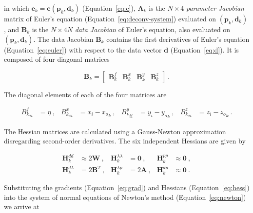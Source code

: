 \noindent
in which $\mathbf{e}_k = \mathbf{e}(\mathbf{p}_k,\mathbf{d}_k)$
(Equation~\ref{eq:e}), $\mathbf{A}_k$ is the $N \times 4$ \textit{parameter
Jacobian} matrix of Euler's equation (Equation~\ref{eq:deconv-system})
evaluated on $(\mathbf{p}_k,\mathbf{d}_k)$, and $\mathbf{B}_k$ is the $N \times
4N$ \textit{data Jacobian} of Euler's equation, also evaluated on
$(\mathbf{p}_k,\mathbf{d}_k)$.
The data Jacobian $\mathbf{B}_k$ contains the first derivatives of Euler's
equation (Equation~\ref{eq:euler})
with respect to the data vector $\mathbf{d}$ (Equation~\ref{eq:d}).
It is composed of four diagonal matrices

\begin{equation}
  \mathbf{B}_k =
  \begin{bmatrix}
    \mathbf{B}^f_k &
    \mathbf{B}^x_k &
    \mathbf{B}^y_k &
    \mathbf{B}^z_k
  \end{bmatrix}
  \ .
  \label{eq:B}
\end{equation}

\noindent
The diagonal elements of each of the four matrices are

\begin{equation}
  \begin{aligned}
    {B^f_k}_{ii} &= \eta \ , &
    {B^x_k}_{ii} &= x_i - {x_o}_k \ , &
    {B^y_k}_{ii} &= y_i - {y_o}_k \ , &
    {B^z_k}_{ii} &= z_i - {z_o}_k \ .
  \end{aligned}
\end{equation}

The Hessian matrices are calculated using a Gauss-Newton approximation
disregarding second-order derivatives. The six independent Hessians are given
by

\begin{equation}
  \begin{aligned}
    \mathbf{H}^{dd}_k &\approx 2\mathbf{W} \ , &
    \mathbf{H}^{\lambda\lambda}_k &= \mathbf{0} \ , &
    \mathbf{H}^{pp}_k &\approx \mathbf{0} \ ,
    \\
    \mathbf{H}^{d\lambda}_k &= 2\mathbf{B}^T \ , &
    \mathbf{H}^{\lambda p}_k &= 2\mathbf{A} \ , &
    \mathbf{H}^{dp}_k &\approx \mathbf{0} \ .
  \end{aligned}
  \label{eq:hess}
\end{equation}

\noindent
Substituting the gradients (Equation~\ref{eq:grad}) and Hessians
(Equation~\ref{eq:hess}) into the system of normal equations of Newton's method
(Equation~\ref{eq:newton}) we arrive at

